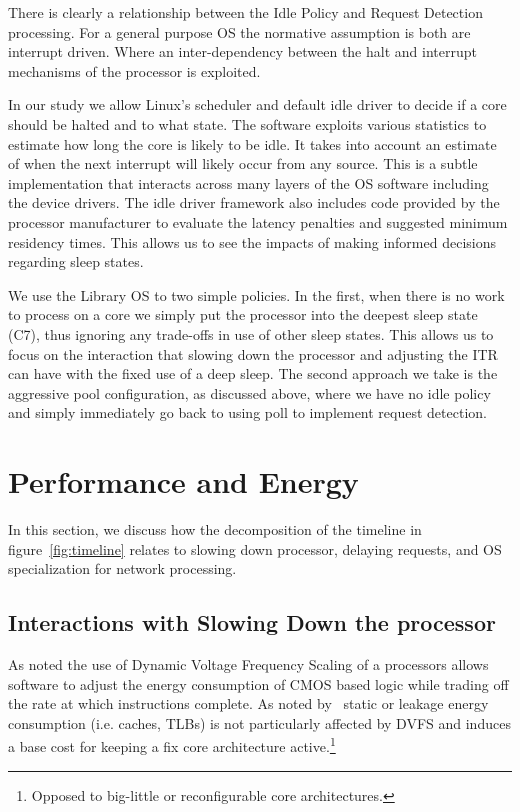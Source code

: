
There is clearly a relationship between the Idle Policy and Request Detection processing.  For a general purpose OS the normative assumption is both are interrupt driven.  Where an inter-dependency between the halt and interrupt mechanisms of the processor is exploited.  

In our study we allow Linux's scheduler and default idle driver to decide if a core should be halted and to what state.  The software exploits various statistics to estimate how long the core is likely to be idle. It takes into account an estimate of when the next interrupt will likely occur from any source.  This is a subtle implementation that interacts across many layers of the OS software including the device drivers.  The idle driver framework also includes code provided by the processor manufacturer to evaluate the latency penalties and suggested minimum residency times.  This allows us to see the impacts of making informed decisions regarding sleep states.  

We use the Library OS to two simple policies.  In the first, when there is no work to process on a core we simply put the processor into the deepest sleep state (C7), thus ignoring any trade-offs in use of other sleep states.   This allows us to focus on the interaction that slowing down the processor and adjusting the ITR can have with the fixed use of a deep sleep.   The second approach we take is the aggressive pool configuration, as discussed above, where we have no idle policy and simply immediately go back to using poll to implement request detection.

\section{Performance and Energy}
\label{sec:slowdown}
In this section, we discuss how the decomposition of the timeline in figure~\ref{fig:timeline} relates to slowing down processor, delaying requests, and OS specialization for network processing.

\subsection{Interactions with Slowing Down the processor}
\label{sec:workflow:dvfs}

As noted the use of Dynamic Voltage Frequency Scaling of a processors allows software to adjust the energy consumption of CMOS based logic while trading off the rate at which instructions complete.  As noted by~\cite{slowdownorsleep, 10.1109/40.888701, pacingtoidle, udpm} static or leakage energy consumption (i.e. caches, TLBs) is not particularly affected by DVFS and induces a base cost for keeping a fix core architecture active.\footnote{Opposed to big-little or reconfigurable core architectures.}

